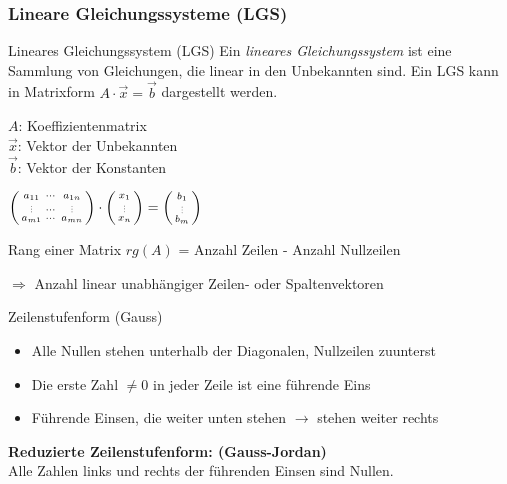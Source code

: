 \subsubsection*{Lineare Gleichungssysteme (LGS)}
    
        \begin{definition}{Lineares Gleichungssystem (LGS)}
            Ein \textit{lineares Gleichungssystem} ist eine Sammlung von Gleichungen, 
            die linear in den Unbekannten sind. 
            Ein LGS kann in Matrixform $A\cdot\vec{x}=\vec{b}$ dargestellt werden.\\
            \begin{minipage}
                {0.45\linewidth}
                {\small
                $A$: Koeffizientenmatrix\\
                $\vec{x}$: Vektor der Unbekannten\\
                $\vec{b}$: Vektor der Konstanten}
            \end{minipage}
            \begin{minipage}{0.55\linewidth}
                $\begin{psmallmatrix} a_{11} & \cdots & a_{1n} \\ \scalebox{0.5}{\vdots} & \cdots & \scalebox{0.5}{\vdots} \\ a_{m1} & \cdots & a_{mn} \end{psmallmatrix} \cdot \begin{psmallmatrix}
                    x_1 \\ \scalebox{0.5}{\vdots} \\ x_n
                \end{psmallmatrix} = \begin{psmallmatrix}
                    b_1 \\ \scalebox{0.5}{\vdots} \\ b_m
                \end{psmallmatrix}$
            \end{minipage}
        \end{definition}

    
        \begin{theorem}{Rang einer Matrix} $rg(A)$ = Anzahl Zeilen - Anzahl Nullzeilen
            
            $\Rightarrow$ Anzahl linear unabhängiger Zeilen- oder Spaltenvektoren
        \end{theorem}


\begin{concept}{Zeilenstufenform (Gauss)}
    \begin{itemize}
        \item Alle Nullen stehen unterhalb der Diagonalen, Nullzeilen zuunterst
        \item Die erste Zahl $\neq 0$ in jeder Zeile ist eine führende Eins
        \item Führende Einsen, die weiter unten stehen $\rightarrow$ stehen weiter rechts
    \end{itemize}
    \textbf{Reduzierte Zeilenstufenform: (Gauss-Jordan)}\\
    Alle Zahlen links und rechts der führenden Einsen sind Nullen.
\end{concept}
    
